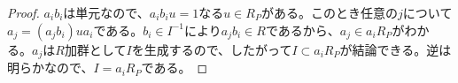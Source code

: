 \begin{proof}
  $a_ib_i$は単元なので、$a_ib_i u = 1$なる$u \in R_P$がある。このとき任意の$j$について$a_j = (a_jb_i) u a_i $である。$b_i \in I^{-1}$により$a_j b_i \in R$であるから、$a_j \in a_i R_P$がわかる。$a_j$は$R$加群として$I$を生成するので、したがって$I \subset a_i R_P$が結論できる。逆は明らかなので、$I = a_i R_P$である。

\end{proof}


